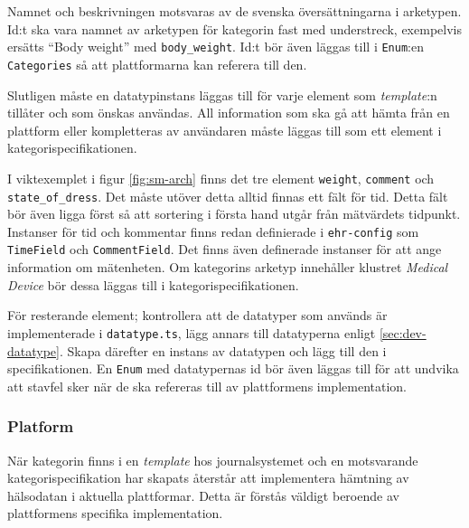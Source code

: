 \documentclass[techdoc/techdoc.tex]{subfiles}
\begin{document}
Namnet och beskrivningen motsvaras av de svenska översättningarna i arketypen.
Id:t ska vara namnet av arketypen för kategorin fast med understreck,
exempelvis ersätts ``Body weight'' med \texttt{body\_weight}. Id:t bör även
läggas till i \texttt{Enum}:en \texttt{Categories} så att plattformarna kan
referera till den.

Slutligen måste en datatypinstans läggas till för varje element som
\emph{template}:n tillåter och som önskas användas. All information som ska gå
att hämta från en plattform eller kompletteras av användaren måste läggas till
som ett element i kategorispecifikationen.

I viktexemplet i figur \ref{fig:sm-arch} finns det tre element \texttt{weight},
\texttt{comment} och \texttt{state\_of\_dress}. Det måste utöver detta alltid
finnas ett fält för tid. Detta fält bör även ligga först så att sortering i
första hand utgår från mätvärdets tidpunkt.  Instanser för tid och kommentar
finns redan definierade i \texttt{ehr-config} som \texttt{TimeField} och
\texttt{CommentField}. Det finns även definerade instanser för att ange
information om mätenheten. Om kategorins arketyp innehåller klustret
\emph{Medical Device} bör dessa läggas till i kategorispecifikationen.

För resterande element; kontrollera att de datatyper som används är
implementerade i \texttt{datatype.ts}, lägg annars till datatyperna enligt
\ref{sec:dev-datatype}. Skapa därefter en instans av datatypen och lägg till
den i specifikationen. En \texttt{Enum} med datatypernas id bör även läggas
till för att undvika att stavfel sker när de ska refereras till av plattformens
implementation.

\subsubsection{Platform}
När kategorin finns i en \emph{template} hos journalsystemet och en motsvarande
kategorispecifikation har skapats återstår att implementera hämtning av
hälsodatan i aktuella plattformar. Detta är förstås väldigt beroende av
plattformens specifika implementation.

\end{document}
